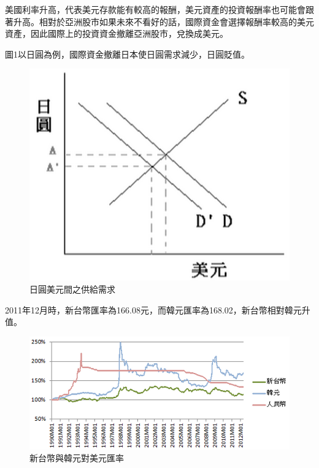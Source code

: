 \documentclass[12pt]{article}
\begin{document}
\begin{CJK}{UTF8}{cwmb}
\begin{num}
\item 
	\begin{num}
		\item 美國利率升高，代表美元存款能有較高的報酬，美元資產的投資報酬率也可能會跟著升高。相對於亞洲股市如果未來不看好的話，國際資金會選擇報酬率較高的美元資產，因此國際上的投資資金撤離亞洲股市，兌換成美元。
		\item 圖1以日圓為例，國際資金撤離日本使日圓需求減少，日圓貶值。
		\begin{figure}[htp]
			\centering
			\includegraphics[scale=0.30]{jpus.png}
			\caption{日圓美元間之供給需求}
			\label{}
		\end{figure}
	\end{num}
\item 
	\begin{num}
		\item 2011年12月時，新台幣匯率為166.08元，而韓元匯率為168.02，新台幣相對韓元升值。
		\begin{figure}[htp]
			\centering
			\includegraphics[scale=0.4]{tkr.png}
			\caption{新台幣與韓元對美元匯率}

\end{figure}
\end{num}
\end{num}
\end{CJK}
\end{document}
